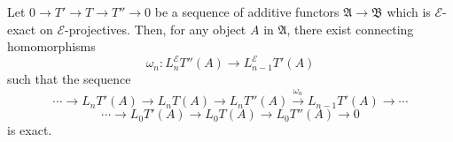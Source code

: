 Let $0 \rightarrow T' \rightarrow T \rightarrow T'' \rightarrow 0$ be a sequence of additive functors $\mathfrak{A} \rightarrow \mathfrak{B}$ which is $\mathcal{E}$-exact on $\mathcal{E}$-projectives. Then, for any object $A$ in $\mathfrak{A}$, there exist connecting homomorphisms
$$\omega_n : L_n^{\mathcal{E}} T''(A) \rightarrow L_{n-1}^{\mathcal{E}} T'(A)$$
such that the sequence
$$\cdots \rightarrow L_n T'(A) \rightarrow L_n T(A) \rightarrow L_n T''(A) \xrightarrow{\omega_n} L_{n-1} T'(A) \rightarrow \cdots$$
$$\cdots \rightarrow L_0 T'(A) \rightarrow L_0 T(A) \rightarrow L_0 T''(A) \rightarrow 0$$
is exact.
